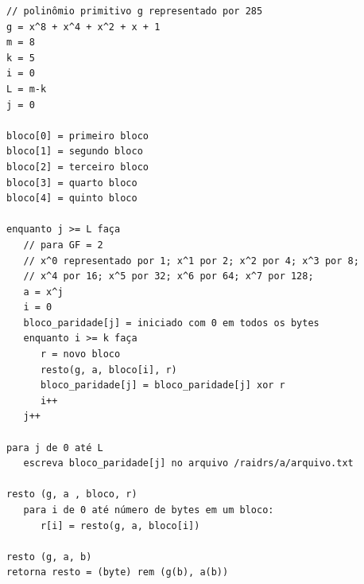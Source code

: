 \begin{verbatim}
// polinômio primitivo g representado por 285
g = x^8 + x^4 + x^2 + x + 1 
m = 8
k = 5
i = 0
L = m-k
j = 0

bloco[0] = primeiro bloco
bloco[1] = segundo bloco
bloco[2] = terceiro bloco
bloco[3] = quarto bloco
bloco[4] = quinto bloco

enquanto j >= L faça
   // para GF = 2
   // x^0 representado por 1; x^1 por 2; x^2 por 4; x^3 por 8; 
   // x^4 por 16; x^5 por 32; x^6 por 64; x^7 por 128;
   a = x^j
   i = 0
   bloco_paridade[j] = iniciado com 0 em todos os bytes
   enquanto i >= k faça
      r = novo bloco
      resto(g, a, bloco[i], r)
      bloco_paridade[j] = bloco_paridade[j] xor r
      i++
   j++
   
para j de 0 até L
   escreva bloco_paridade[j] no arquivo /raidrs/a/arquivo.txt

resto (g, a , bloco, r)
   para i de 0 até número de bytes em um bloco:
      r[i] = resto(g, a, bloco[i])

resto (g, a, b)
retorna resto = (byte) rem (g(b), a(b))
   
\end{verbatim}

